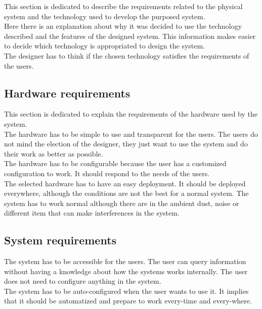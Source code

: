 This section is dedicated to describe the requirements related to the physical system and the technology used to develop the purposed system.\\

Here there is an explanation about why it was decided to use the technology described and the features of the designed system. This information makes easier to decide which technology is appropriated to design the system.\\

The designer has to think if the chosen technology satisfies the requirements of the users.


\subsection{Hardware requirements}

This section is dedicated to explain the requirements of the hardware used by the system.\\

The hardware has to be simple to use and transparent for the users. The users do not mind the election of the designer, they just want to use the system and do their work as better as possible.\\

The hardware has to be configurable because the user has a customized configuration to work. It should respond to the needs of the users.\\

The selected hardware has to have an easy deployment. It should be deployed everywhere, although the conditions are not the best for a normal system. The system has to work normal although there are in the ambient dust, noise or different item that can make interferences in the system.

\subsection{System requirements}

The system has to be accessible for the users. The user can query information without having a knowledge about how the systems works internally. The user does not need to configure anything in the system.\\

The system has to be auto-configured when the user wants to use it. It implies that it should be automatized and prepare to work every-time and every-where.\\

